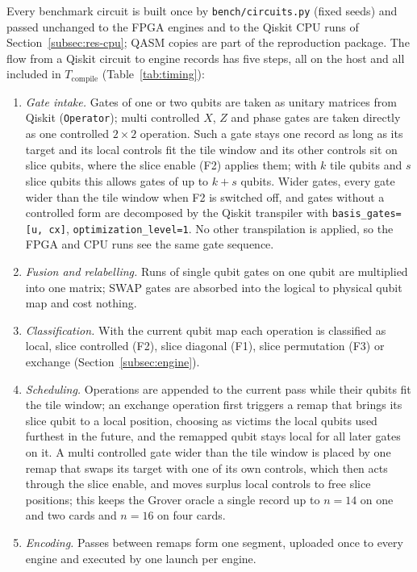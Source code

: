 \documentclass[pdflatex,sn-mathphys-num]{sn-jnl}
\theoremstyle{thmstyleone}
\theoremstyle{thmstylethree}
\begin{document}
Every benchmark circuit is built once by \texttt{bench/circuits.py} (fixed seeds) and passed unchanged to the FPGA
engines and to the Qiskit CPU runs of Section~\ref{subsec:res-cpu}; QASM copies are part of the reproduction package.
The flow from a Qiskit circuit to engine records has five steps, all on the host and all included in
$T_{\mathrm{compile}}$ (Table~\ref{tab:timing}):
\begin{enumerate}
\item \emph{Gate intake.} Gates of one or two qubits are taken as unitary matrices from Qiskit
(\texttt{Operator}); multi controlled $X$, $Z$ and phase gates are taken directly as one controlled $2\times2$
operation. Such a gate stays one record as long as its target and its local controls fit the tile window and its
other controls sit on slice qubits, where the slice enable (F2) applies them; with $k$ tile qubits and $s$ slice qubits
this allows gates of up to $k+s$ qubits. Wider gates, every gate wider than the tile window when F2 is switched off,
and gates without a controlled form are decomposed by the Qiskit transpiler with \texttt{basis\_gates=[u, cx]},
\texttt{optimization\_level=1}. No other transpilation is applied, so the
FPGA and CPU runs see the same gate sequence.
\item \emph{Fusion and relabelling.} Runs of single qubit gates on one qubit are multiplied into one matrix; SWAP
gates are absorbed into the logical to physical qubit map and cost nothing.
\item \emph{Classification.} With the current qubit map each operation is classified as local, slice controlled
(F2), slice diagonal (F1), slice permutation (F3) or exchange (Section~\ref{subsec:engine}).
\item \emph{Scheduling.} Operations are appended to the current pass while their qubits fit the tile window;
an exchange operation first triggers a remap that brings its slice qubit to a local position, choosing as victims the
local qubits used furthest in the future, and the remapped qubit stays local for all later gates on it. A multi controlled gate wider than the tile window is placed by one remap that swaps its target with one of
its own controls, which then acts through the slice enable, and moves surplus local controls to free slice positions;
this keeps the Grover oracle a single record up to $n=14$ on one and two cards and $n=16$ on four cards.
\item \emph{Encoding.} Passes between remaps form one segment, uploaded once to every engine and executed by one
launch per engine.
\end{enumerate}
\end{document}
